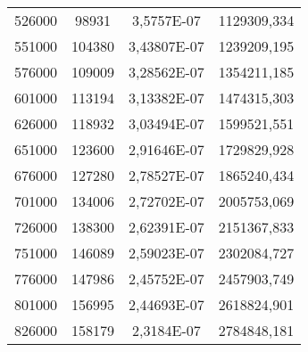 \documentclass[a4paper,12pt]{article} %
\begin{document}
\begin{table}[H]
{\begin{tabular}{|c|c|c|c|}
			526000                                             & 98931                & 3,5757E-07                  & 1129309,334                                      \\
			551000                                             & 104380               & 3,43807E-07                 & 1239209,195                                      \\
			576000                                             & 109009               & 3,28562E-07                 & 1354211,185                                      \\
			601000                                             & 113194               & 3,13382E-07                 & 1474315,303                                      \\
			626000                                             & 118932               & 3,03494E-07                 & 1599521,551                                      \\
			651000                                             & 123600               & 2,91646E-07                 & 1729829,928                                      \\
			676000                                             & 127280               & 2,78527E-07                 & 1865240,434                                      \\
			701000                                             & 134006               & 2,72702E-07                 & 2005753,069                                      \\
			726000                                             & 138300               & 2,62391E-07                 & 2151367,833                                      \\
			751000                                             & 146089               & 2,59023E-07                 & 2302084,727                                      \\
			776000                                             & 147986               & 2,45752E-07                 & 2457903,749                                      \\
			801000                                             & 156995               & 2,44693E-07                 & 2618824,901                                      \\
			826000                                             & 158179               & 2,3184E-07                  & 2784848,181                                      \\

\end{tabular}}
\end{table}
\end{document}
